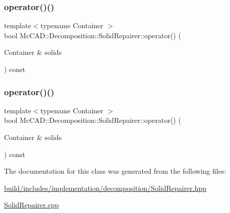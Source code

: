 \subsubsection{\texorpdfstring{operator()()}{operator()()}\hspace{0.1cm}{\footnotesize\ttfamily [3/4]}}
{\footnotesize\ttfamily template$<$typename Container $>$ \\
bool Mc\+C\+A\+D\+::\+Decomposition\+::\+Solid\+Repairer\+::operator() (\begin{DoxyParamCaption}\item[{Container \&}]{solids }\end{DoxyParamCaption}) const}

\mbox{\label{classMcCAD_1_1Decomposition_1_1SolidRepairer_a3d721f81f2649ad178fc07cbc65dd6bc}} 
\subsubsection{\texorpdfstring{operator()()}{operator()()}\hspace{0.1cm}{\footnotesize\ttfamily [4/4]}}
{\footnotesize\ttfamily template$<$typename Container $>$ \\
bool Mc\+C\+A\+D\+::\+Decomposition\+::\+Solid\+Repairer\+::operator() (\begin{DoxyParamCaption}\item[{Container \&}]{solids }\end{DoxyParamCaption}) const}



The documentation for this class was generated from the following files\+:\begin{DoxyCompactItemize}
\item 
\hyperlink{build_2includes_2implementation_2decomposition_2SolidRepairer_8hpp}{build/includes/implementation/decomposition/\+Solid\+Repairer.\+hpp}\item 
\hyperlink{SolidRepairer_8cpp}{Solid\+Repairer.\+cpp}\end{DoxyCompactItemize}
